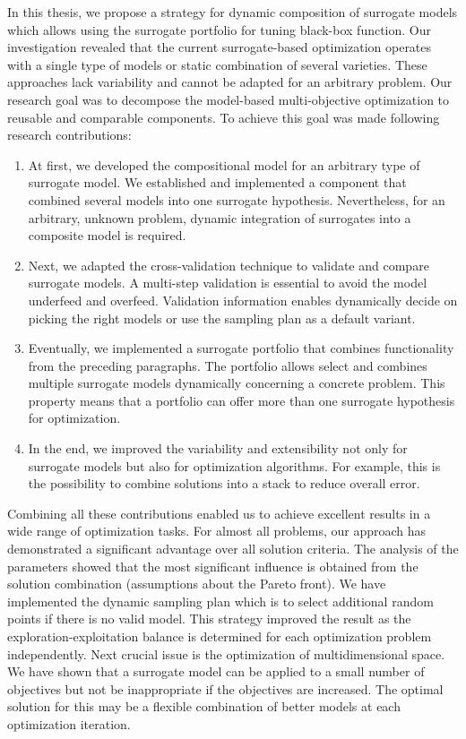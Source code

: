     In this thesis, we propose a strategy for dynamic composition of surrogate models which allows using the surrogate portfolio for tuning black-box function.
        Our investigation revealed that the current surrogate-based optimization operates with a single type of models or static combination of several varieties. These approaches lack variability and cannot be adapted for an arbitrary problem. Our research goal was to decompose the model-based multi-objective optimization to reusable and comparable components. 
    To achieve this goal was made following research contributions:
    \begin{enumerate}
        \item At first, we developed the compositional model for an arbitrary type of surrogate model. We established and implemented a component that combined several models into one surrogate hypothesis. Nevertheless, for an arbitrary, unknown problem, dynamic integration of surrogates into a composite model is required.
        \item Next, we adapted the cross-validation technique to validate and compare surrogate models. A multi-step validation is essential to avoid the model underfeed and overfeed. Validation information enables dynamically decide on picking the right models or use the sampling plan as a default variant.
        \item Eventually, we implemented a surrogate portfolio that combines functionality from the preceding paragraphs. The portfolio allows select and combines multiple surrogate models dynamically concerning a concrete problem. This property means that a portfolio can offer more than one surrogate hypothesis for optimization.
        \item In the end, we improved the variability and extensibility not only for surrogate models but also for optimization algorithms. For example, this is the possibility to combine solutions into a stack to reduce overall error.
    \end{enumerate}


    Combining all these contributions enabled us to achieve excellent results in a wide range of optimization tasks. For almost all problems, our approach has demonstrated a significant advantage over all solution criteria. The analysis of the parameters showed that the most significant influence is obtained from the solution combination (assumptions about the Pareto front). We have implemented the dynamic sampling plan which is to select additional random points if there is no valid model. This strategy  improved the result as the exploration-exploitation balance is determined for each optimization problem independently.
    Next crucial issue is the optimization of multidimensional space. We have shown that a surrogate model can be applied to a small number of objectives but not be inappropriate if the objectives are increased. The optimal solution for this may be a flexible combination of better models at each optimization iteration.

